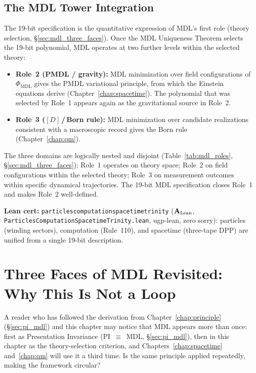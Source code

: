\documentclass[11pt,openany]{book}
\theoremstyle{remark}
\newcommand{\PHIMDL}{\Phi_{\mathrm{MDL}}}
\newcommand{\lean}[1]{%
  \penalty-100
  \begingroup\def\_{\textunderscore\allowbreak}\texttt{#1}\endgroup}
\newcommand{\CatAL}{\ensuremath{\textbf{A}_{\rm Lean}}}
\begin{document}


\subsection*{The MDL Tower Integration}

The 19-bit specification is the quantitative expression of MDL's first role (theory
selection, \S\ref{sec:mdl_three_faces}). Once the MDL Uniqueness Theorem selects the 19-bit polynomial,
MDL operates at two further levels within the selected theory:

\begin{itemize}[itemsep=4pt]
\item \textbf{Role~2 (PMDL / gravity):} MDL minimization over field configurations
  of $\PHIMDL$ gives the PMDL variational principle, from which the Einstein equations
  derive (Chapter~\ref{chap:spacetime}). The polynomial that was selected by Role~1
  appears again as the gravitational source in Role~2.
\item \textbf{Role~3 ($[D]$\,/\,Born rule):} MDL minimization over candidate
  realizations consistent with a macroscopic record gives the Born rule
  (Chapter~\ref{chap:qm}).
\end{itemize}

The three domains are logically nested and disjoint (Table~\ref{tab:mdl_roles},
\S\ref{sec:mdl_three_faces}): Role~1 operates on theory space; Role~2 on field
configurations within the selected theory; Role~3 on measurement outcomes within
specific dynamical trajectories. The 19-bit MDL specification closes Role~1 and
makes Role~2 well-defined.

{\sloppy
\textbf{Lean cert:} \lean{particles\_computation\_spacetime\_trinity} (\CatAL,
\texttt{ParticlesComputationSpacetimeTrinity.lean}, ugp-lean, zero sorry):
particles (winding sectors), computation (Rule~110), and spacetime (three-tape DPP)
are unified from a single 19-bit description.
\par}

\section{Three Faces of MDL Revisited: Why This Is Not a Loop}
\label{sec:mdl_loop}

A reader who has followed the derivation from Chapter~\ref{chap:principle}
(\S\ref{sec:pi_mdl}) and this chapter may notice that MDL appears more than once:
first as Presentation Invariance (PI~$\equiv$~MDL, \S\ref{sec:pi_mdl}), then in
this chapter as the theory-selection criterion, and Chapters~\ref{chap:spacetime}
and~\ref{chap:qm} will use it a third time. Is the same principle applied repeatedly,
making the framework circular?
\end{document}
